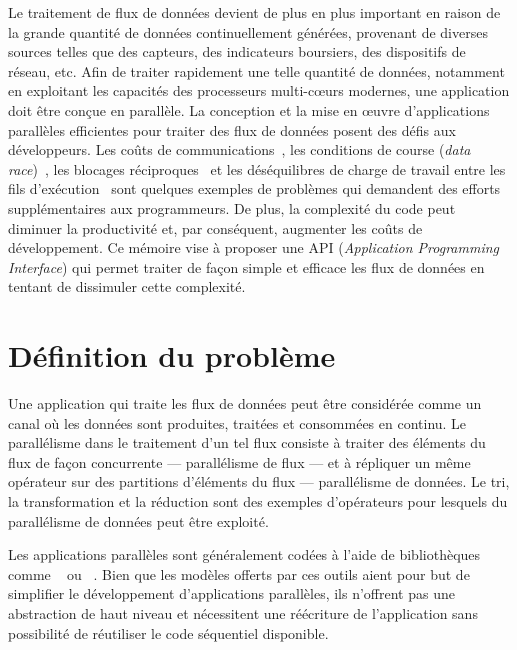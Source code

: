 \begin{introduction}

Le traitement de flux de donn\'ees devient de plus en plus important en raison de la grande quantit\'e de donn\'ees continuellement g\'en\'er\'ees, provenant de diverses sources telles que des capteurs, des indicateurs boursiers, des dispositifs de r\'eseau, etc. Afin de traiter rapidement une telle quantit\'e de donn\'ees, notamment en exploitant les capacit\'es des processeurs multi-cœurs modernes, une application doit \^etre con\c cue en parall\`ele. La conception et la mise en œuvre d'applications parall\`eles efficientes pour traiter des flux de donn\'ees posent des d\'efis aux d\'eveloppeurs. Les co\^uts de communications~\citep{amarasinghe2011ascr}, les conditions de course (\emph{data race})~\citep{wu2015detecting}, les blocages r\'eciproques~\citep{haque2006concurrent} et les d\'es\'equilibres de charge de travail entre les fils d'ex\'ecution~\citep{amarasinghe2011ascr} sont quelques exemples de probl\`emes qui demandent des efforts suppl\'ementaires aux programmeurs. De plus, la complexit\'e du code peut diminuer la productivit\'e et, par cons\'equent, augmenter les co\^uts de d\'eveloppement. Ce m\'emoire vise \`a proposer une API (\emph{Application Programming Interface}) qui permet traiter de fa\c con simple et efficace les flux de donn\'ees en tentant de dissimuler cette complexit\'e.

\section*{D\'efinition du probl\`eme}

Une application qui traite les flux de données peut \^etre consid\'er\'ee comme un canal o\`u les donn\'ees sont produites, trait\'ees et consomm\'ees en continu. Le parall\'elisme dans le traitement d'un tel flux consiste \`a traiter des \'el\'ements du flux de fa\c{c}on concurrente --- parall\'elisme de flux --- et \`a r\'epliquer un m\^eme op\'erateur sur des partitions d'\'el\'ements du flux --- parall\'elisme de donn\'ees. Le tri, la transformation et la r\'eduction sont des exemples d'op\'erateurs pour lesquels du parall\'elisme de donn\'ees peut \^etre exploit\'e. 

Les applications parall\`eles sont g\'en\'eralement cod\'ees \`a l'aide de biblioth\`eques comme ~\citep{AldinucciEtAl14} ou ~\citep{Reinders07}. Bien que les mod\`eles offerts par ces outils aient pour but de simplifier le d\'eveloppement d'applications parall\`eles, ils n'offrent pas une abstraction de haut niveau et n\'ecessitent une r\'e\'ecriture de l'application sans possibilit\'e de r\'eutiliser le code s\'equentiel disponible.


\end{introduction}
